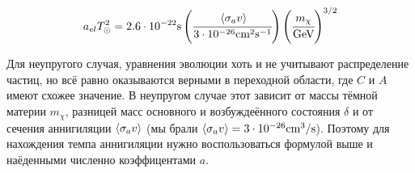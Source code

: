 \begin{equation}
	a_{el}T_{\odot}^2 = 
	2.6\cdot10^{-22} \text{s}	\left(\cfrac{   \left\langle \sigma_{a}v \right\rangle    }{3\cdot10^{-26} \text{cm}^2\text{s}^{-1}} \right)
	\left(\cfrac{m_{\chi}}{\text{GeV}}\right)^{3/2}
\end{equation}

Для неупругого случая, уравнения эволюции хоть и не учитывают распределение частиц, но всё равно оказываются верными в переходной области, где $C$ и $A$ имеют схожее значение. 
В неупругом случае этот зависит от массы тёмной материи $m_{\chi}$, разницей масс основного и возбуждеённого состояния $\delta$ и от сечения аннигиляции $\left\langle \sigma_{a}v \right\rangle$ (мы брали $\left\langle \sigma_{a}v \right\rangle = 3\cdot 10^{-26} \text{cm}^3/\text{s}$). Поэтому для нахождения темпа аннигиляции нужно воспользоваться формулой выше и наёденными численно коэффицентами $a$.